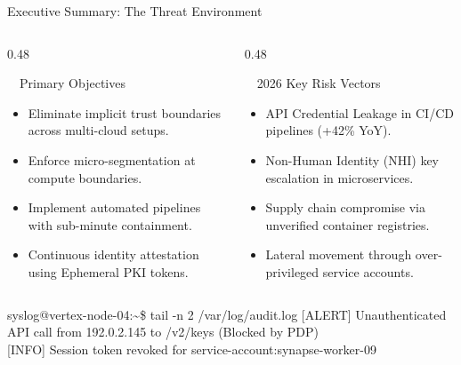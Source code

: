 \documentclass[aspectratio=169, 10pt]{beamer}
\begin{document}
\begin{frame}{Executive Summary: The Threat Environment}
  \begin{columns}[T]
    \begin{column}{0.48\textwidth}
      \begin{cybercard}{\faLock\ \ Primary Objectives}
        \begin{itemize}
          \item Eliminate implicit trust boundaries across multi-cloud setups.
          \item Enforce micro-segmentation at compute boundaries.
          \item Implement automated pipelines with sub-minute containment.
          \item Continuous identity attestation using Ephemeral PKI tokens.
        \end{itemize}
      \end{cybercard}
    \end{column}
    \begin{column}{0.48\textwidth}
      \begin{alertcard}{\faExclamationTriangle\ \ 2026 Key Risk Vectors}
        \begin{itemize}
          \item API Credential Leakage in CI/CD pipelines (+42\% YoY).
          \item Non-Human Identity (NHI) key escalation in microservices.
          \item Supply chain compromise via unverified container registries.
          \item Lateral movement through over-privileged service accounts.
        \end{itemize}
      \end{alertcard}
    \end{column}
  \end{columns}

  \vspace{4pt}
  \begin{terminalbox}{syslog@vertex-node-04:\textasciitilde\$ tail -n 2 /var/log/audit.log}
    {\ttfamily\color{cyberamber}\small [ALERT] Unauthenticated API call from 192.0.2.145 to /v2/keys (Blocked by PDP)}\\[1pt]
    {\ttfamily\color{cybergreen}\small [INFO] Session token revoked for service-account:synapse-worker-09}
  \end{terminalbox}
\end{frame}
\end{document}
